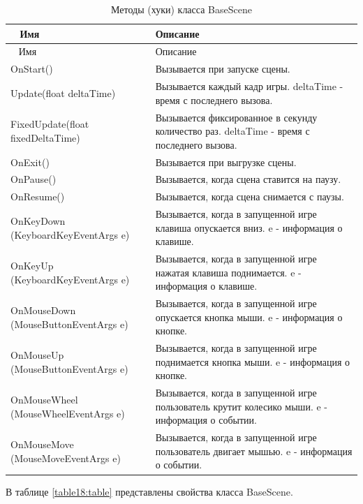 \begin{xltabular}{\textwidth}{|>{\raggedright\arraybackslash}p{6cm}|>{\raggedright\arraybackslash}X|}
	\caption{Методы (хуки) класса BaseScene\label{table17:table}}\\ \hline
	~ \centrow Имя & \centrow Описание \\ \hline
	\endfirsthead
	~ \centrow Имя & \centrow Описание \\ \hline 
	\finishhead
	OnStart() & Вызывается при запуске сцены. \\ \hline
	Update(float deltaTime) & Вызывается каждый кадр игры. deltaTime - время с последнего вызова. \\ \hline
	FixedUpdate(float fixedDeltaTime) & Вызывается фиксированное в секунду количество раз. deltaTime - время с последнего вызова. \\ \hline
	OnExit() & Вызывается при выгрузке сцены. \\ \hline
	OnPause() & Вызывается, когда сцена ставится на паузу. \\ \hline
	OnResume() & Вызывается, когда сцена снимается с паузы. \\ \hline
	OnKeyDown
	(KeyboardKeyEventArgs e) & Вызывается, когда в запущенной игре клавиша опускается вниз. e - информация о клавише. \\ \hline
	OnKeyUp
	(KeyboardKeyEventArgs e) & Вызывается, когда в запущенной игре нажатая клавиша поднимается. e - информация о клавише. \\ \hline
	OnMouseDown
	(MouseButtonEventArgs e) & Вызывается, когда в запущенной игре опускается кнопка мыши. e - информация о кнопке. \\ \hline
	OnMouseUp
	(MouseButtonEventArgs e) & Вызывается, когда в запущенной игре поднимается кнопка мыши. e - информация о кнопке. \\ \hline
	OnMouseWheel
	(MouseWheelEventArgs e) & Вызывается, когда в запущенной игре пользователь крутит колесико мыши. e - информация о событии. \\ \hline
	OnMouseMove
	(MouseMoveEventArgs e) & Вызывается, когда в запущенной игре пользователь двигает мышью. e - информация о событии.
\end{xltabular}

В таблице \ref{table18:table} представлены свойства класса BaseScene.

